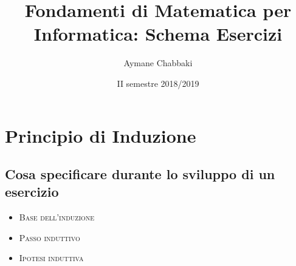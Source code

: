 \documentclass[10pt]{article}
\title{Fondamenti di Matematica per Informatica: Schema Esercizi}
\author{Aymane Chabbaki}
\date{II semestre 2018/2019}
\begin{document}
	\maketitle
	\tableofcontents
	\newpage
	
  \section{Principio di Induzione}
	\subsection{Cosa specificare durante lo sviluppo di un esercizio}
	\begin{itemize}
	\item
	\textsc{Base dell'induzione}
	\item
	\textsc{Passo induttivo}
	\item
	\textsc{Ipotesi induttiva}
	\end{itemize}
	
\end{document}
